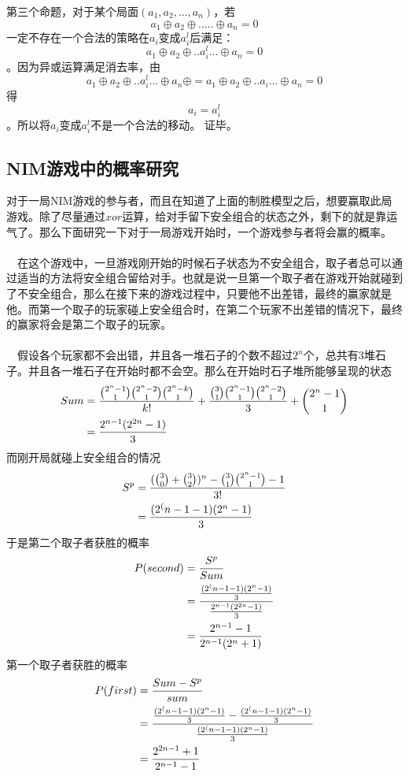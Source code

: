 \documentclass[UTF8,nofonts,cs4size]{ctexrep}
\begin{document}
第三个命题，对于某个局面$(a_1,a_2,...,a_n)$，若
\[a_1 \oplus a_2  \oplus  ..... \oplus  a_n  = 0\]一定不存在一个合法的策略在$a_i$变成$a_i^l$后满足：
\[a_1 \oplus a_2  \oplus  .. a_i^l... \oplus  a_n  = 0\]。因为异或运算满足消去率，由
\[a_1 \oplus a_2  \oplus  .. a_i^l... \oplus  a_n \oplus = a_1 \oplus a_2  \oplus  ..a_i... \oplus  a_n = 0\]
得\[a_i=a_i^l\]。所以将$a_i$变成$a_i^l$不是一个合法的移动。
\newline 证毕。

\subsection{NIM游戏中的概率研究}
\indent
对于一局NIM游戏的参与者，而且在知道了上面的制胜模型之后，想要赢取此局游戏。除了尽量通过$xor$运算，给对手留下安全组合的状态之外，剩下的就是靠运气了。那么下面研究一下对于一局游戏开始时，一个游戏参与者将会赢的概率。
\paragraph*{}
\indent
\ \
在这个游戏中，一旦游戏刚开始的时候石子状态为不安全组合，取子者总可以通过适当的方法将安全组合留给对手。也就是说一旦第一个取子者在游戏开始就碰到了不安全组合，那么在接下来的游戏过程中，只要他不出差错，最终的赢家就是他。而第一个取子的玩家碰上安全组合时，在第二个玩家不出差错的情况下，最终的赢家将会是第二个取子的玩家。
\paragraph*{}
\indent
\ \
假设各个玩家都不会出错，并且各一堆石子的个数不超过$2^n$个，总共有3堆石子。并且各一堆石子在开始时都不会空。那么在开始时石子堆所能够呈现的状态
\begin{align}
Sum & =\frac{\binom{2^n-1}{1}\binom{2^n-2}{1}\binom{2^n-k}{1}}{k!}+\frac{\binom{3}{1}\binom{2^n-1}{1}\binom{2^n-2}{1}}{3}+\binom{2^n-1}{1} \notag \\
& =\frac{2^{n-1}(2^{2n}-1)}{3}
\end{align}
而刚开局就碰上安全组合的情况
\begin{align}
S^p & = \frac{(\binom{3}{0}+\binom{3}{2})^n-\binom{3}{1}\binom{2^n-1}{1}-1}{3!} \notag \\
& = \frac{(2^({n-1}-1)(2^n-1)}{3}
\end{align}
于是第二个取子者获胜的概率
\begin{align}
P(second) &= \frac{S^p}{Sum} \notag \\
&=\frac{\frac{(2^({n-1}-1)(2^n-1)}{3} }{\frac{2^{n-1}(2^{2n}-1)}{3}} \notag \\
&=\frac{2^{n-1}-1}{2^{n-1}(2^n+1)}
\end{align}
第一个取子者获胜的概率
\begin{align}
P(first) &=\frac{Sum-S^p}{sum} \notag \\
&=\frac{\frac{(2^({n-1}-1)(2^n-1)}{3}  -   \frac{(2^({n-1}-1)(2^n-1)}{3}  }{\frac{(2^({n-1}-1)(2^n-1)}{3} } \notag \\
&=\frac{2^{2n-1}+1}{2^{n-1}-1}
\end{align}
\end{document}
